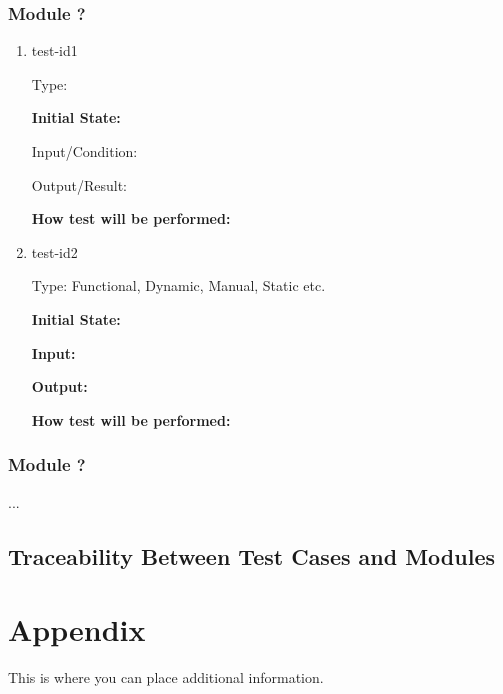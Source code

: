 \documentclass[12pt, titlepage]{article}
\begin{document}
\subsubsection{Module ?}
		
\begin{enumerate}

\item{test-id1\\}

Type: 
					
\textbf{Initial State:} 
					
Input/Condition: 
					
Output/Result: 
					
\textbf{How test will be performed:} 
					
\item{test-id2\\}

Type: Functional, Dynamic, Manual, Static etc.
					
\textbf{Initial State:} 
					
\textbf{Input:} 
					
\textbf{Output:} 
					
\textbf{How test will be performed:} 

\end{enumerate}

\subsubsection{Module ?}

...

\subsection{Traceability Between Test Cases and Modules}

				




\newpage

\section{Appendix}

This is where you can place additional information.
\end{document}
